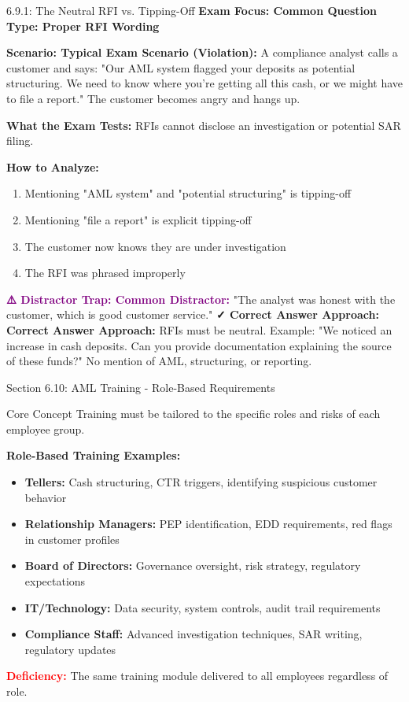\documentclass[11pt,a4paper]{beamer}
\newcommand{\redflag}[1]{\textcolor{red}{\textbf{#1}}}
\newcommand{\examfocus}[1]{\textcolor{orange!80!black}{\textbf{Exam Focus: #1}}}
\newcommand{\trap}[1]{\textcolor{purple}{\textbf{⚠️ Distractor Trap: #1}}}
\newcommand{\correct}[1]{\textcolor{green!50!black}{\textbf{✓ Correct Answer Approach: #1}}}
\newcommand{\scenario}[1]{\textcolor{blue!70!black}{\textbf{Scenario: #1}}}
\begin{document}
	\begin{frame}{6.9.1: The Neutral RFI vs. Tipping-Off}
		\examfocus{Common Question Type: Proper RFI Wording}
		
		\scenario{Typical Exam Scenario (Violation):}
		A compliance analyst calls a customer and says: "Our AML system flagged your deposits as potential structuring. We need to know where you're getting all this cash, or we might have to file a report." The customer becomes angry and hangs up.
		
		\textbf{What the Exam Tests:} RFIs cannot disclose an investigation or potential SAR filing.
		
		\textbf{How to Analyze:}
		\begin{enumerate}
			\item Mentioning "AML system" and "potential structuring" is tipping-off
			\item Mentioning "file a report" is explicit tipping-off
			\item The customer now knows they are under investigation
			\item The RFI was phrased improperly
		\end{enumerate}
		
		\trap{Common Distractor:} "The analyst was honest with the customer, which is good customer service."
		\correct{Correct Answer Approach:} RFIs must be neutral. Example: "We noticed an increase in cash deposits. Can you provide documentation explaining the source of these funds?" No mention of AML, structuring, or reporting.
	\end{frame}
	
	
	\begin{frame}{Section 6.10: AML Training - Role-Based Requirements}
		\begin{block}{Core Concept}
			Training must be tailored to the specific roles and risks of each employee group.
		\end{block}
		\textbf{Role-Based Training Examples:}
		\begin{itemize}
			\item \textbf{Tellers:} Cash structuring, CTR triggers, identifying suspicious customer behavior
			\item \textbf{Relationship Managers:} PEP identification, EDD requirements, red flags in customer profiles
			\item \textbf{Board of Directors:} Governance oversight, risk strategy, regulatory expectations
			\item \textbf{IT/Technology:} Data security, system controls, audit trail requirements
			\item \textbf{Compliance Staff:} Advanced investigation techniques, SAR writing, regulatory updates
		\end{itemize}
		\redflag{Deficiency:} The same training module delivered to all employees regardless of role.
	\end{frame}
	
\end{document}
